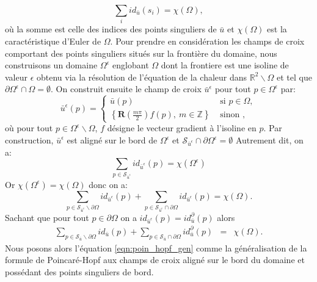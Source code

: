\begin{equation}
    \label{eqn:first_Poincare_Hopf}
    \sum_i id_{\bar{u}}(s_i)=\chi(\Omega),
\end{equation}
où la somme est celle des indices des points singuliers de $\bar{u}$ et $\chi(\Omega)$ est la caractéristique d'Euler de $\Omega$. Pour prendre en considération les champs de croix comportant des points singuliers situés sur la frontière du domaine, nous construisons un domaine $\Omega^\epsilon$ englobant $\Omega$ dont la frontiere est une isoline de valeur $\epsilon$ obtenu via la résolution de l'équation de la chaleur dans $\mathbb{R}^2\backslash\Omega$ et tel que $\partial\Omega^\epsilon\cap\Omega=\emptyset$. On construit ensuite le champ de croix $\bar{u}^\epsilon$ pour tout $p\in\Omega^\epsilon$ par:
$$
\bar{u}^\epsilon(p)=
\left\{
\begin{array}{ll}
\bar{u}(p)& \mbox{ si } p\in\Omega,\\[0.5cm]
\left\{\mathbf{R}\left(\displaystyle\frac{m\pi}{2}\right)f(p),~ m\in \mathbb{Z}\right\} & \mbox{ sinon },
\end{array}
\right.
$$
où pour tout $p\in\Omega^\epsilon\backslash\Omega$, $f$ désigne le vecteur gradient à l'isoline en $p$. Par construction, $\bar{u}^\epsilon$ est aligné sur le bord de $\Omega^\epsilon$ et $\mathcal{S}_{\bar{u}^\epsilon}\cap\partial\Omega^\epsilon=\emptyset$ Autrement dit, on a:
$$
\sum_{p\in\mathcal{S}_{\bar{u}^\epsilon}} id_{\bar{u}^\epsilon}(p)=\chi(\Omega^\epsilon)
$$
Or $\chi(\Omega^\epsilon)=\chi(\Omega)$ donc on a:
$$
\sum_{p\in\mathcal{S}_{\bar{u}^\epsilon}\backslash\partial\Omega} id_{\bar{u}^\epsilon}(p)+\sum_{p\in\mathcal{S}_{\bar{u}^\epsilon}\cap\partial\Omega} id_{\bar{u}^\epsilon}(p)=\chi(\Omega).
$$
Sachant que pour tout $p\in\partial\Omega$ on a $id_{\bar{u}^\epsilon}(p)=id^\partial_{\bar{u}}(p)$ alors
\begin{eqnarray}
    \label{eqn:poin_hopf_gen}
    \sum_{p\in\mathcal{S}_{\bar{u}}\backslash\partial\Omega} id_{\bar{u}}(p)+\sum_{p\in\mathcal{S}_{\bar{u}}\cap\partial\Omega} id^\partial_{\bar{u}}(p)&=&\chi(\Omega).
\end{eqnarray}
Nous posons alors l'équation \eqref{eqn:poin_hopf_gen} comme la généralisation de la formule de Poincaré-Hopf aux champs de croix aligné sur le bord du domaine et possédant des points singuliers de bord.


